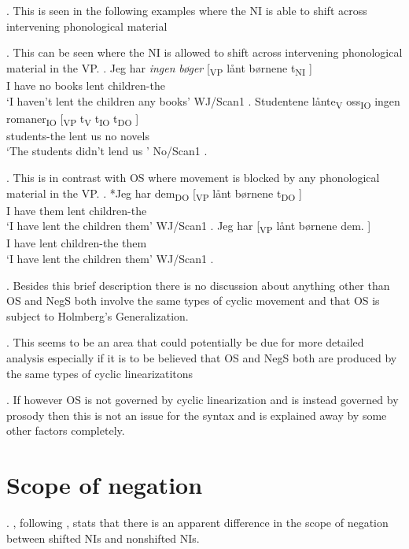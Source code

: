 \documentclass[12pt, letterpaper]{article}
\begin{document}
\ex. This is seen in the following examples where the NI is able to shift across intervening phonological material

\ex. This can be seen where the NI is allowed to shift across intervening phonological material in the VP.
	\ag. Jeg har \textit{ingen} \textit{bøger} [\textsubscript{VP} lånt børnene t\textsubscript{NI} ]\\
	I have no books {} lent children-the\\
	`I haven't lent the children any books' \hfill WJ/Scan1
	\bg. Studentene lånte\textsubscript{V} oss\textsubscript{IO} ingen romaner\textsubscript{IO} [\textsubscript{VP} t\textsubscript{V} t\textsubscript{IO} t\textsubscript{DO} ]\\
	students-the lent us no novels\\	
	`The students didn't lend us ' \hfill No/Scan1
	\z.
	
\ex. This is in contrast with OS where movement is blocked by any phonological material in the VP.
	\ag. *Jeg har dem\textsubscript{DO} [\textsubscript{VP} lånt børnene t\textsubscript{DO} ]\\
	I have them {} lent children-the\\
	`I have lent the children them' \hfill WJ/Scan1
	\bg. Jeg har [\textsubscript{VP}  lånt børnene dem. ]\\
	I have {} lent children-the them\\	
	`I have lent the children them' \hfill WJ/Scan1
	\z.

\ex. Besides this brief description there is no discussion about anything other than OS and NegS both involve the same types of cyclic movement and that OS is subject to Holmberg's Generalization.

\ex. This seems to be an area that could potentially be due for more detailed analysis especially if it is to be believed that OS and NegS both are produced by the same types of cyclic linearizatitons

\ex. If however OS is not governed by cyclic linearization and is instead governed by prosody then this is not an issue for the syntax and is explained away by some other factors completely.

\section{Scope of negation}

\ex. \citet{engelsScandinavianNegativeIndefinites2012}, following \citet{svenoniusStrainsNegationNorwegian2002}, stats that there is an apparent difference in the scope of negation between shifted NIs and nonshifted NIs.
\end{document}
